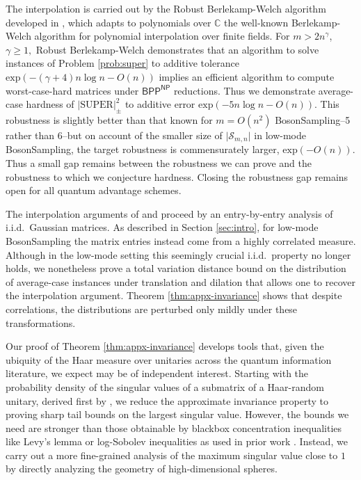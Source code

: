 \documentclass[11pt]{article}
\theoremstyle{plain}
\theoremstyle{plain}
\theoremstyle{plain}
\theoremstyle{plain}
\theoremstyle{plain}
\theoremstyle{plain}
\theoremstyle{plain}
\theoremstyle{remark}
\theoremstyle{remark}
\theoremstyle{plain}
\theoremstyle{plain}
\theoremstyle{plain}
\theoremstyle{plain}
\newcommand{\superap}{\lvert \mathrm{SUPER}\rvert^2_\pm}
\renewcommand{\exp}{\mathrm{exp}}
\begin{document}
The interpolation is carried out by the Robust Berlekamp-Welch algorithm  developed in \cite{Bouland2021}, which adapts to polynomials over $\mathbb{C}$ the well-known Berlekamp-Welch algorithm \cite{BW} for polynomial interpolation over finite fields. For $m>2n^\gamma$, $\gamma\geq 1,$ Robust Berlekamp-Welch demonstrates that an algorithm to solve instances of Problem \ref{prob:super} to additive tolerance $\exp(-(\gamma + 4) n \log n - O(n))$ implies an efficient algorithm to compute worst-case-hard matrices under $\mathsf{BPP}^\mathsf{NP}$ reductions. Thus we demonstrate average-case hardness of $\superap$ to additive error $\exp(-5n\log n - O(n)).$ This robustness is slightly better than that known for $m=O(n^2)$ BosonSampling--5 rather than 6--but on account of the smaller size of $\vert\mathcal S_{m,n}\vert$ in low-mode BosonSampling, the target robustness is commensurately larger, $\exp(-O(n)).$ Thus a small gap remains between the robustness we can prove and the robustness to which we conjecture hardness.  Closing the robustness gap remains open for all quantum advantage schemes. 


The interpolation arguments of \cite{Aaronson2013} and \cite{Bouland2021} proceed by an entry-by-entry analysis of i.i.d.\ Gaussian matrices. As described in Section \ref{sec:intro}, for low-mode BosonSampling the matrix entries instead come from a highly correlated measure. Although in the low-mode setting this seemingly crucial i.i.d.\ property no longer holds, 
we nonetheless prove a total variation distance bound on the distribution of average-case instances under translation and dilation that allows one to recover the interpolation argument. Theorem \ref{thm:appx-invariance} shows that despite correlations, the distributions are perturbed only mildly under these transformations.

Our proof of Theorem \ref{thm:appx-invariance} develops tools that, given the ubiquity of the Haar measure over unitaries across the quantum information literature, we expect may be of independent interest. Starting with the probability density of the singular values of a submatrix of a Haar-random unitary, derived first by \cite{collins2003integrales}, we reduce the approximate invariance property to proving sharp tail bounds on the largest singular value. However, the bounds we need are stronger than those obtainable by blackbox concentration inequalities like Levy's lemma or log-Sobolev inequalities as used in prior work  \cite{singal2022implementation}. Instead, we carry out a more fine-grained analysis of the maximum singular value close to $1$ by directly analyzing the geometry of high-dimensional spheres. 
\end{document}
